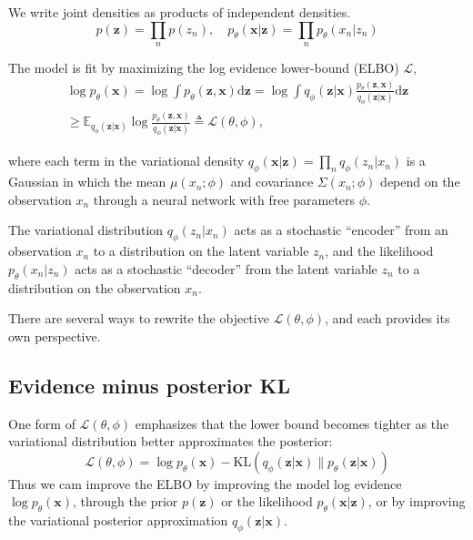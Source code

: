 \documentclass[5p,sort&compress]{elsarticle}
\begin{document}
We write joint densities as products of independent densities.
\begin{equation}
p(\boldsymbol{z})=\prod_{n} p\left(z_{n}\right), \quad p_{\theta}(\boldsymbol{x} | \boldsymbol{z})=\prod_{n} p_{\theta}\left(x_{n} | z_{n}\right)
\end{equation}

The model is fit by maximizing the log evidence lower-bound (ELBO) $\mathcal{L}$,
\begin{equation}
\begin{aligned}
\log p_{\theta}(\boldsymbol{x})=\log \int p_{\theta}(\boldsymbol{z}, \boldsymbol{x}) \mathrm{d} \boldsymbol{z}=\log \int q_{\phi}(\boldsymbol{z} | \boldsymbol{x}) \frac{p_{\theta}(\boldsymbol{z}, \boldsymbol{x})}{q_{\phi}(\boldsymbol{z} | \boldsymbol{x})} \mathrm{d} \boldsymbol{z} \\
\geq \mathbb{E}_{q_{\phi}(\boldsymbol{z} | \boldsymbol{x})} \log \frac{p_{\theta}(\boldsymbol{z}, \boldsymbol{x})}{q_{\phi}(\boldsymbol{z} | \boldsymbol{x})} \triangleq \mathcal{L}(\theta, \phi),
\end{aligned}
\end{equation}

where each term in the variational density $q_{\phi}(\boldsymbol{x} | \boldsymbol{z})=\prod_{n} q_{\phi}\left(z_{n} | x_{n}\right)$ is a Gaussian in which the mean $\mu(x_n ; \phi)$ and covariance $\Sigma\left(x_{n} ; \phi\right)$ depend on the observation $x_n$ through a neural network with free parameters $\phi$.

The variational distribution $q_{\phi}(z_n|x_n)$ acts as a stochastic ``encoder'' from an observation $x_n$ to a distribution on the latent variable $z_n$, and the likelihood $p_{\theta}(x_n | z_n)$ acts as a stochastic ``decoder'' from the latent variable $z_n$ to a distribution on the observation $x_n$.

There are several ways to rewrite the objective $\mathcal{L}(\theta, \phi)$, and each provides its own perspective.


\subsection{Evidence minus posterior KL}

One form of $\mathcal{L}(\theta, \phi)$ emphasizes that the lower bound becomes tighter as the variational distribution better approximates the posterior:
\begin{equation}
\mathcal{L}(\theta, \phi)=\log p_{\theta}(\boldsymbol{x})-\mathrm{KL}\left(q_{\phi}(\boldsymbol{z} | \boldsymbol{x}) \| p_{\theta}(\boldsymbol{z} | \boldsymbol{x})\right)
\end{equation}
Thus we cam improve the ELBO by improving the model log evidence $\log p_{\theta}(\boldsymbol{x})$, through the prior $p(\boldsymbol{z})$ or the likelihood $p_{\theta}(\boldsymbol{x} | \boldsymbol{z})$, or by improving the variational posterior approximation $q_{\phi}(\boldsymbol{z} | \boldsymbol{x})$.
\end{document}
